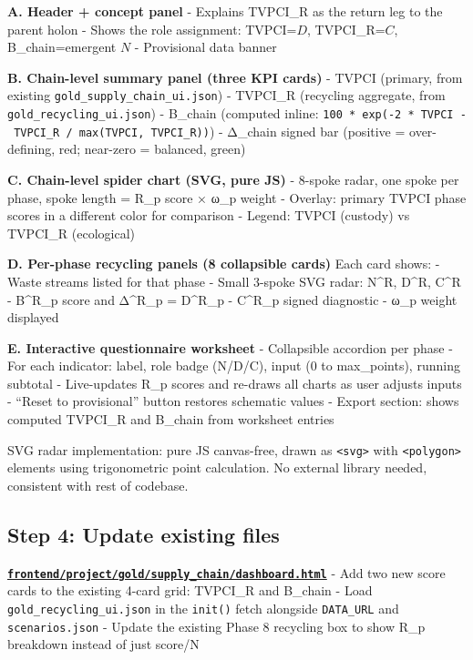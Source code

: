 \documentclass[
  11pt,
]{article}
\begin{document}
\textbf{A. Header + concept panel} - Explains TVPCI\_R as the return leg
to the parent holon - Shows the role assignment: TVPCI=\(D\),
TVPCI\_R=\(C\), B\_chain=emergent \(N\) - Provisional data banner

\textbf{B. Chain-level summary panel (three KPI cards)} - TVPCI
(primary, from existing \texttt{gold\_supply\_chain\_ui.json}) -
TVPCI\_R (recycling aggregate, from \texttt{gold\_recycling\_ui.json}) -
B\_chain (computed inline:
\texttt{100\ *\ exp(-2\ *\ \textbar{}TVPCI\ -\ TVPCI\_R\textbar{}\ /\ max(TVPCI,\ TVPCI\_R))})
- Δ\_chain signed bar (positive = over-defining, red; near-zero =
balanced, green)

\textbf{C. Chain-level spider chart (SVG, pure JS)} - 8-spoke radar, one
spoke per phase, spoke length = R\_p score × ω\_p weight - Overlay:
primary TVPCI phase scores in a different color for comparison - Legend:
TVPCI (custody) vs TVPCI\_R (ecological)

\textbf{D. Per-phase recycling panels (8 collapsible cards)} Each card
shows: - Waste streams listed for that phase - Small 3-spoke SVG radar:
N\^{}R, D\^{}R, C\^{}R - B\^{}R\_p score and Δ\^{}R\_p = D\^{}R\_p -
C\^{}R\_p signed diagnostic - ω\_p weight displayed

\textbf{E. Interactive questionnaire worksheet} - Collapsible accordion
per phase - For each indicator: label, role badge (N/D/C), input (0 to
max\_points), running subtotal - Live-updates R\_p scores and re-draws
all charts as user adjusts inputs - ``Reset to provisional'' button
restores schematic values - Export section: shows computed TVPCI\_R and
B\_chain from worksheet entries

SVG radar implementation: pure JS canvas-free, drawn as
\texttt{\textless{}svg\textgreater{}} with
\texttt{\textless{}polygon\textgreater{}} elements using trigonometric
point calculation. No external library needed, consistent with rest of
codebase.

\subsection{Step 4: Update existing
files}\label{step-4-update-existing-files}

\textbf{\href{frontend/project/gold/supply_chain/dashboard.html}{\texttt{frontend/project/gold/supply\_chain/dashboard.html}}}
- Add two new score cards to the existing 4-card grid: TVPCI\_R and
B\_chain - Load \texttt{gold\_recycling\_ui.json} in the \texttt{init()}
fetch alongside \texttt{DATA\_URL} and \texttt{scenarios.json} - Update
the existing Phase 8 recycling box to show R\_p breakdown instead of
just score/N
\end{document}
